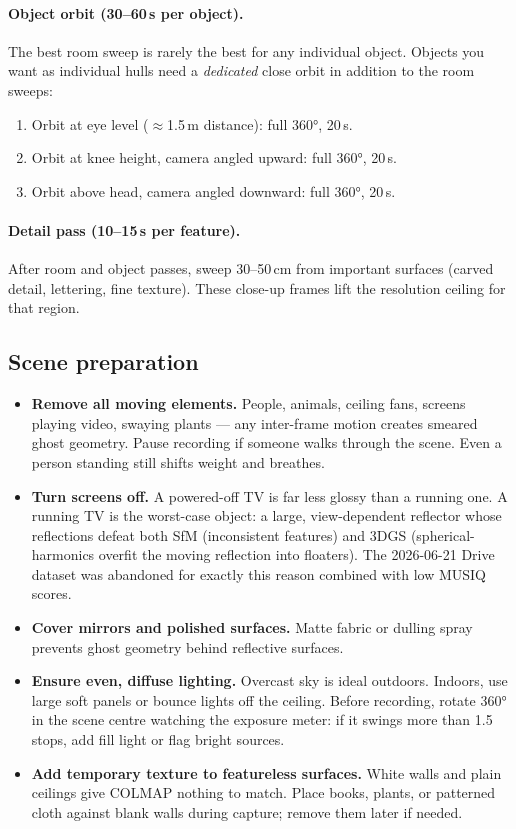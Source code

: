 \paragraph{Object orbit (30--60\,s per object).}
The best room sweep is rarely the best for any individual object.  Objects you
want as individual hulls need a \emph{dedicated} close orbit in addition to
the room sweeps:
\begin{enumerate}[nosep]
  \item Orbit at eye level ($\approx$1.5\,m distance): full 360°, 20\,s.
  \item Orbit at knee height, camera angled upward: full 360°, 20\,s.
  \item Orbit above head, camera angled downward: full 360°, 20\,s.
\end{enumerate}

\paragraph{Detail pass (10--15\,s per feature).}
After room and object passes, sweep 30--50\,cm from important surfaces (carved
detail, lettering, fine texture).  These close-up frames lift the resolution
ceiling for that region.

\subsection{Scene preparation}
\label{sec:pb-scene-prep}

\begin{itemize}
  \item \textbf{Remove all moving elements.}  People, animals, ceiling fans,
        screens playing video, swaying plants — any inter-frame motion creates
        smeared ghost geometry.  Pause recording if someone walks through the
        scene.  Even a person standing still shifts weight and breathes.
  \item \textbf{Turn screens off.}  A powered-off TV is far less glossy than a
        running one.  A running TV is the worst-case object: a large,
        view-dependent reflector whose reflections defeat both SfM (inconsistent
        features) and 3DGS (spherical-harmonics overfit the moving reflection
        into floaters).  The 2026-06-21 Drive dataset was abandoned for exactly
        this reason combined with low MUSIQ scores.
  \item \textbf{Cover mirrors and polished surfaces.}  Matte fabric or dulling
        spray prevents ghost geometry behind reflective surfaces.
  \item \textbf{Ensure even, diffuse lighting.}  Overcast sky is ideal outdoors.
        Indoors, use large soft panels or bounce lights off the ceiling.  Before
        recording, rotate 360° in the scene centre watching the exposure meter:
        if it swings more than 1.5 stops, add fill light or flag bright sources.
  \item \textbf{Add temporary texture to featureless surfaces.}  White walls and
        plain ceilings give COLMAP nothing to match.  Place books, plants, or
        patterned cloth against blank walls during capture; remove them later if
        needed.
\end{itemize}

